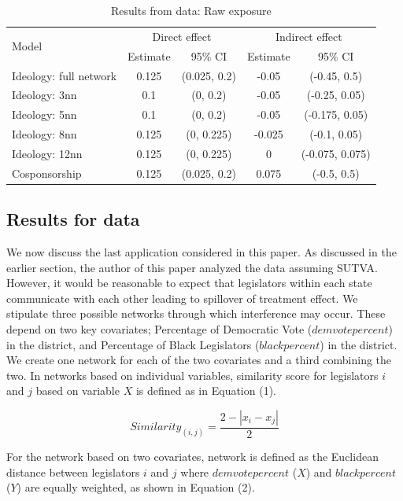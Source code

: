 \documentclass[12pt]{article}
\begin{document}
\begin{table}[h]
\centering
\begin{tabular}{lcccc}
\toprule
\multirow{2}{*}{Model} & \multicolumn{2}{c}{Direct effect} & \multicolumn{2}{c}{Indirect effect} \\
\cmidrule(l){2-3} \cmidrule(l){4-5}
 & Estimate & 95\% CI & Estimate & 95\% CI \\
\midrule
Ideology: full network  & 0.125 & (0.025, 0.2) &  -0.05 & (-0.45, 0.5)\\
Ideology: 3nn & 0.1 & (0, 0.2) & -0.05 & (-0.25, 0.05)\\
Ideology: 5nn & 0.1 & (0, 0.2) & -0.05 & (-0.175, 0.05)\\
Ideology: 8nn & 0.125 & (0, 0.225) & -0.025 & (-0.1, 0.05)\\
Ideology: 12nn & 0.125 & (0, 0.225) & 0 & (-0.075, 0.075)\\
Cosponsorship & 0.125 & (0.025, 0.2) & 0.075 & (-0.5, 0.5)\\
\bottomrule
\end{tabular}
\caption{Results from \citet{bergan2015call} data: Raw exposure}
\end{table}


\subsection{Results for \citet{broockman2013black} data}

We now discuss the last application considered in this paper. As discussed in the earlier section, the author of this paper analyzed the data assuming SUTVA. However, it would be reasonable to expect that legislators within each state communicate with each other leading to spillover of treatment effect. We stipulate three possible networks through which interference may occur. These depend on two key covariates; Percentage of Democratic Vote ($demvotepercent$) in the district, and Percentage of Black Legislators ($blackpercent$) in the district. We create one network for each of the two covariates and a third combining the two. In networks based on individual variables, similarity score for legislators $i$ and $j$ based on variable $X$ is defined as in Equation (1).

\begin{equation}
Similarity_{(i,j)} = \frac{2 - |x_i - x_j|}{2}
\end{equation}

For the network based on two covariates, network is defined as the Euclidean distance between legislators $i$ and $j$ where $demvotepercent$ ($X$) and $blackpercent$ ($Y$) are equally weighted, as shown in Equation (2).
\end{document}
